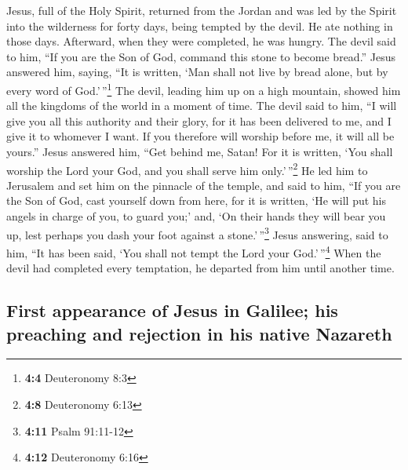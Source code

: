 \begin{paracol}{2}
\begin{otherlanguage}{english}
 Jesus, full of the Holy Spirit, returned from the Jordan
and was led by the Spirit into the wilderness  for forty
days, being tempted by the devil. He ate nothing in those days.
Afterward, when they were completed, he was hungry.  The
devil said to him, ``If you are the Son of God, command this stone to
become bread.''  Jesus answered him, saying, ``It is
written, `Man shall not live by bread alone, but by every word of
God.'\,''\footnote{\textbf{4:4} Deuteronomy 8:3}  The
devil, leading him up on a high mountain, showed him all the kingdoms of
the world in a moment of time.  The devil said to him, ``I
will give you all this authority and their glory, for it has been
delivered to me, and I give it to whomever I want.  If you
therefore will worship before me, it will all be yours.'' 
Jesus answered him, ``Get behind me, Satan! For it is written, `You
shall worship the Lord your God, and you shall serve him
only.'\,''\footnote{\textbf{4:8} Deuteronomy 6:13}  He led
him to Jerusalem and set him on the pinnacle of the temple, and said to
him, ``If you are the Son of God, cast yourself down from here,
 for it is written, `He will put his angels in charge of
you, to guard you;'  and, `On their hands they will bear
you up, lest perhaps you dash your foot against a stone.'\,''\footnote{\textbf{4:11}
  Psalm 91:11-12}  Jesus answering, said to him, ``It has
been said, `You shall not tempt the Lord your God.'\,''\footnote{\textbf{4:12}
  Deuteronomy 6:16}  When the devil had completed every
temptation, he departed from him until another time.

\hypertarget{first-appearance-of-jesus-in-galilee-his-preaching-and-rejection-in-his-native-nazareth}{%
\subsection{First appearance of Jesus in Galilee; his preaching and
rejection in his native
Nazareth}\label{first-appearance-of-jesus-in-galilee-his-preaching-and-rejection-in-his-native-nazareth}}


\end{otherlanguage}
\end{paracol}
